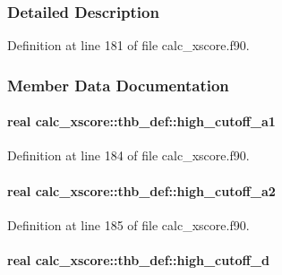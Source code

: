 \subsubsection{Detailed Description}


Definition at line 181 of file calc\-\_\-xscore.\-f90.



\subsubsection{Member Data Documentation}
\hypertarget{structcalc__xscore_1_1thb__def_ad7256f0f60e196b2617272a587bc7656}{
\paragraph[{high\-\_\-cutoff\-\_\-a1}]{\setlength{\rightskip}{0pt plus 5cm}real calc\-\_\-xscore\-::thb\-\_\-def\-::high\-\_\-cutoff\-\_\-a1}}\label{structcalc__xscore_1_1thb__def_ad7256f0f60e196b2617272a587bc7656}


Definition at line 184 of file calc\-\_\-xscore.\-f90.

\hypertarget{structcalc__xscore_1_1thb__def_a32990b8ca6bf48022d6b92afd035a4c0}{
\paragraph[{high\-\_\-cutoff\-\_\-a2}]{\setlength{\rightskip}{0pt plus 5cm}real calc\-\_\-xscore\-::thb\-\_\-def\-::high\-\_\-cutoff\-\_\-a2}}\label{structcalc__xscore_1_1thb__def_a32990b8ca6bf48022d6b92afd035a4c0}


Definition at line 185 of file calc\-\_\-xscore.\-f90.

\hypertarget{structcalc__xscore_1_1thb__def_ad99aabc341870fadb205bdea588b9ac0}{
\paragraph[{high\-\_\-cutoff\-\_\-d}]{\setlength{\rightskip}{0pt plus 5cm}real calc\-\_\-xscore\-::thb\-\_\-def\-::high\-\_\-cutoff\-\_\-d}}\label{structcalc__xscore_1_1thb__def_ad99aabc341870fadb205bdea588b9ac0}


